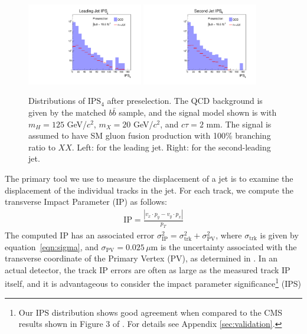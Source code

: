 \documentclass{JHEP3}
\newcommand{\IP}{\textrm{IP}}
\newcommand{\IPS}{\textrm{IPS}}
\newcommand{\trk}{\textrm{trk}}
\begin{document}
\begin{figure}[ht]
\centering
\includegraphics[width=0.45\textwidth]{pre_trkips1_4.pdf}
\includegraphics[width=0.45\textwidth]{pre_trkips2_4.pdf}
\caption{Distributions of $\IPS_{4}$ after preselection. The QCD background is given by the matched $b\bar{b}$
sample, and the signal model shown is with $m_H=125$ GeV/$c^2$, $m_X=20$ GeV/$c^2$, and $c\tau=2$ mm. The signal is
assumed to have SM gluon fusion production with 100\% branching ratio to $XX$. Left: for the leading jet. Right: for
the second-leading jet.}
\label{fig:IPS4}
\end{figure}

The primary tool we use to measure the displacement of a jet is to examine the displacement of the individual
tracks in the jet. For each track, we compute the transverse Impact Parameter (IP) as follows:
\begin{align}
\IP=\frac{|v_x\cdot p_y - v_y\cdot p_x|}{p_{T}}
\end{align}
The computed $\IP$ has an associated error $\sigma_{\IP}^2=\sigma^2_{\trk}+ \sigma^2_{\textrm{PV}}$, where
$\sigma_{\trk}$ is given by equation~\ref{eqn:sigma}, and $\sigma_{\textrm{PV}}=0.025\,\mu\textrm{m}$ is the uncertainty associated
with the transverse coordinate of the Primary Vertex (PV), as determined in \cite{CMS:2010wta}.  In an actual
detector, the track IP errors are often as large as the measured track IP itself, and it is advantageous to
consider the impact parameter significance\footnote{Our $\IPS$ distribution shows good agreement when compared
to the CMS results shown in Figure 3 of \cite{Rizzi:2006ms}. For details see Appendix \ref{sec:validation}.} (IPS) \cite{Chatrchyan:2012jua}
\end{document}

